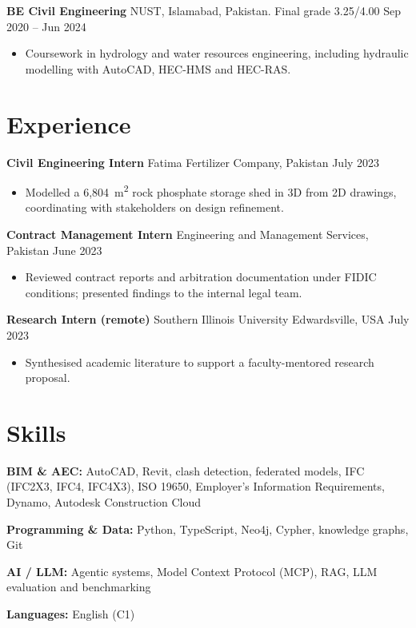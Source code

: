 \documentclass[a4paper,10.5pt]{article}
\newcommand{\datefill}{\dotfill}
\newcommand{\entry}[3]{\vspace{2.5pt}\noindent\textbf{#1} \textbar{} #2 \datefill{} #3\par\vspace{0.5pt}}
\newcommand{\skillrow}[2]{\noindent\textbf{#1:} #2\par\vspace{1pt}}
\begin{document}
\entry{BE Civil Engineering}{NUST, Islamabad, Pakistan. Final grade 3.25/4.00}{Sep 2020 -- Jun 2024}
\begin{itemize}
  \item Coursework in hydrology and water resources engineering, including hydraulic
        modelling with AutoCAD, HEC-HMS and HEC-RAS.
\end{itemize}

\section{Experience}
\entry{Civil Engineering Intern}{Fatima Fertilizer Company, Pakistan}{July 2023}
\begin{itemize}
  \item Modelled a 6,804~m\textsuperscript{2} rock phosphate storage shed in 3D from
        2D drawings, coordinating with stakeholders on design refinement.
\end{itemize}

\entry{Contract Management Intern}{Engineering and Management Services, Pakistan}{June 2023}
\begin{itemize}
  \item Reviewed contract reports and arbitration documentation under FIDIC
        conditions; presented findings to the internal legal team.
\end{itemize}

\entry{Research Intern (remote)}{Southern Illinois University Edwardsville, USA}{July 2023}
\begin{itemize}
  \item Synthesised academic literature to support a faculty-mentored research proposal.
\end{itemize}

\section{Skills}

\skillrow{BIM \& AEC}{AutoCAD, Revit, clash detection, federated models, IFC (IFC2X3, IFC4, IFC4X3), ISO 19650, Employer's Information Requirements, Dynamo, Autodesk Construction Cloud}
\skillrow{Programming \& Data}{Python, TypeScript, Neo4j, Cypher, knowledge graphs, Git}
\skillrow{AI / LLM}{Agentic systems, Model Context Protocol (MCP), RAG, LLM evaluation and benchmarking}

\skillrow{Languages}{English (C1)}
\end{document}
